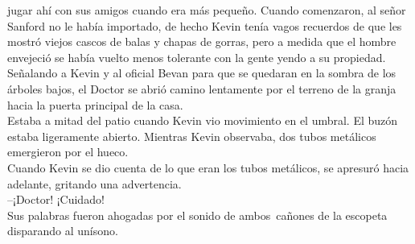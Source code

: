 jugar ahí con sus amigos cuando era más pequeño. Cuando comenzaron, al
señor Sanford no le había importado, de hecho Kevin tenía vagos
recuerdos de que les mostró viejos cascos de balas y chapas de gorras,
pero a medida que el hombre envejeció se había vuelto menos tolerante
con la gente yendo a su propiedad.\\
Señalando a Kevin y al oficial Bevan para que se quedaran en la sombra
de los árboles bajos, el Doctor se abrió camino lentamente por el
terreno de la granja hacia la puerta principal de la casa.\\
Estaba a mitad del patio cuando Kevin vio movimiento en el umbral. El
buzón estaba ligeramente abierto. Mientras Kevin observaba, dos tubos
metálicos emergieron por el hueco.\\
Cuando Kevin se dio cuenta de lo que eran los tubos metálicos, se
apresuró hacia adelante, gritando una advertencia.\\
--¡Doctor! ¡Cuidado!\\
Sus palabras fueron ahogadas por el sonido de ambos~cañones de la
escopeta disparando al unísono.\\
